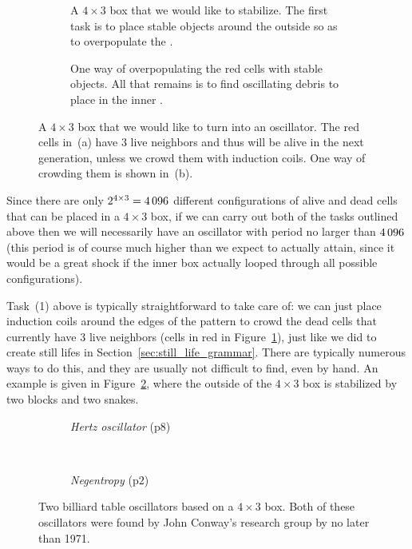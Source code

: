 \begin{figure}[!htb]
	\centering
	\begin{subfigure}{.48\textwidth}
		\centering
		\caption{A $4 \times 3$ box that we would like to stabilize. The first task is to place stable objects around the outside so as to overpopulate the .}
		\label{fig:billiard_table_start_1}
	\end{subfigure} \hfill %
	\begin{subfigure}{.48\textwidth}
		\centering
		\caption{One way of overpopulating the red cells with stable objects. All that remains is to find oscillating debris to place in the inner .}
		\label{fig:billiard_table_start_2}
	\end{subfigure}
	\caption{A $4 \times 3$ box that we would like to turn into an oscillator. The red cells in~(a) have 3 live neighbors and thus will be alive in the next generation, unless we crowd them with induction coils. One way of crowding them is shown in~(b).}\label{fig:billiard_table_start}
\end{figure}

Since there are only $2^{4 \times 3} = 4{\,}096$ different configurations of alive and dead cells that can be placed in a $4 \times 3$ box, if we can carry out both of the tasks outlined above then we will necessarily have an oscillator with period no larger than $4{\,}096$ (this period is of course much higher than we expect to actually attain, since it would be a great shock if the inner box actually looped through all possible configurations).

Task~(1) above is typically straightforward to take care of: we can just place induction coils around the edges of the pattern to crowd the dead cells that currently have 3 live neighbors (cells in red in Figure~\ref{fig:billiard_table_start_1}), just like we did to create still lifes in Section~\ref{sec:still_life_grammar}. There are typically numerous ways to do this, and they are usually not difficult to find, even by hand. An example is given in Figure~\ref{fig:billiard_table_start_2}, where the outside of the $4 \times 3$ box is stabilized by two blocks and two snakes.

\begin{figure}[!htb]
	\centering
	\begin{subfigure}{.48\textwidth}
		\centering
		\caption{\emph{Hertz oscillator} (p$8$)}
		\label{fig:hertz_oscillator}
	\end{subfigure} \ \ \ \ %
	\begin{subfigure}{.48\textwidth}
		\centering
		\caption{\emph{Negentropy} (p$2$)}
		\label{fig:negentropy}
	\end{subfigure}
	\caption{Two billiard table oscillators based on a $4 \times 3$ box. Both of these oscillators were found by John Conway's research group by no later than 1971.}\label{fig:hertz_negen}
\end{figure}

